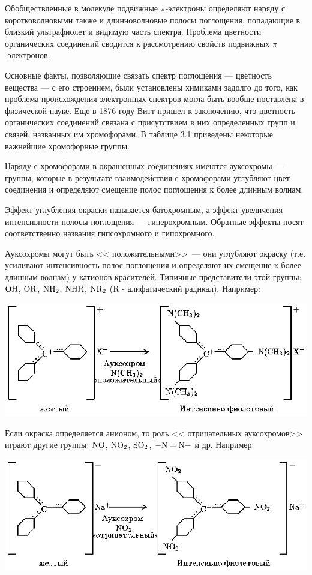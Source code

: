 Обобществленные в молекуле подвижные $\pi$-электроны определяют
наряду с коротковолновыми также и длинноволновые полосы
поглощения, попадающие в близкий ультрафиолет и видимую часть
спектра. Проблема цветности органических соединений сводится к
рассмотрению свойств подвижных $\pi$-электронов.

Основные факты, позволяющие связать спектр поглощения ---
цветность вещества --- с его строением, были установлены химиками
задолго до того, как проблема происхождения электронных спектров
могла быть вообще поставлена в физической науке. Еще в 1876 году
Витт пришел к заключению, что цветность органических соединений
связана с присутствием в них определенных групп и связей,
названных им хромофорами. В таблице 3.1 приведены некоторые
важнейшие хромофорные группы.

Наряду с хромофорами в окрашенных соединениях имеются ауксохромы
--- группы, которые в результате взаимодействия с хромофорами
углубляют цвет соединения и определяют смещение полос поглощения к
более длинным волнам.

Эффект углубления окраски называется батохромным, а эффект
увеличения интенсивности полосы поглощения --- гиперохромным.
Обратные эффекты носят соответственно названия гипсохромного и
гипохромного.

Ауксохромы могут быть << положительными>>\ --- они углубляют
окраску (т.е. усиливают интенсивность полос поглощения и
определяют их смещение к более длинным волнам) у катионов
красителей. Типичные представители этой группы: $\rm OH$, $\rm
OR$, $\rm NH_2$, $\rm NHR$, $\rm NR_2$ (R - алифатический
радикал). Например: 
\vskip 3mm
\centerline{\hbox{\includegraphics[scale=0.7]{Ris/ris_eps/ris3_05b.eps}}}

\vskip -2mm \leftskip 0cm Если окраска определяется анионом, то
роль << отрицательных ауксохромов>> играют другие группы: $\rm
NO$, $\rm NO_2$, $\rm SO_2$, $\rm -N=N-$ и др. Например:

\vskip 3mm
\centerline{\hbox{\includegraphics[scale=0.7]{Ris/ris_eps/ris3_05c.eps}}}

